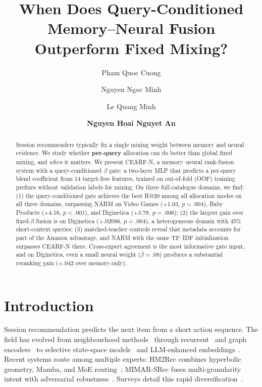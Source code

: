 \documentclass[runningheads]{llncs}
\newcommand{\method}{CEARF-N}
\begin{document}
\title{When Does Query-Conditioned Memory--Neural Fusion Outperform Fixed Mixing?}
\author{Pham Quoc Cuong \and
Nguyen Ngoc Minh \and
Le Quang Minh \and
\textbf{Nguyen Hoai Nguyet An}}
\maketitle

\begin{abstract}
Session recommenders typically fix a single mixing weight between memory and
neural evidence. We study whether \textbf{per-query} allocation can do better
than global fixed mixing, and \emph{when} it matters. We present \method{}, a
memory--neural rank-fusion system with a query-conditioned $\beta$ gate: a
two-layer MLP that predicts a per-query blend coefficient from 14 target-free
features, trained on out-of-fold (OOF) training prefixes without validation
labels for mixing. On three full-catalogue domains, we find: (1) the
query-conditioned gate achieves the best R@20 among all allocation modes on
all three domains, surpassing NARM on Video Games ($+$1.03, $p=.004$), Baby
Products ($+$4.16, $p<.001$), and Diginetica ($+$3.78, $p=.006$); (2) the
largest gain over fixed-$\beta$ fusion is on Diginetica ($+$.02086,
$p=.004$), a heterogeneous domain with 45\% short-context queries; (3)
matched-teacher controls reveal that metadata accounts for part of the Amazon
advantage, and NARM with the same TF--IDF initialization surpasses \method{}
there. Cross-expert agreement is the most informative gate input, and on
Diginetica, even a small neural weight ($\bar\beta = .08$) produces a
substantial reranking gain ($+$.042 over memory-only).
\end{abstract}

\section{Introduction}
Session recommendation predicts the next item from a short action sequence.
The field has evolved from neighbourhood methods~\cite{ludewig2018evaluation,
garg2019stan} through recurrent~\cite{hidasi2016gru4rec,quadrana2018recsys}
and graph encoders~\cite{wu2019srgnn} to selective state-space
models~\cite{sigma2025,gu2024mamba4rec} and LLM-enhanced
embeddings~\cite{llm2rec2025}. Recent systems route among multiple experts:
HM2Rec combines hyperbolic geometry, Mamba, and MoE
routing~\cite{liu2026hm2rec}; MIMAR-SRec fuses multi-granularity intent with
adversarial robustness~\cite{fang2026mimar}. Surveys detail this rapid
diversification~\cite{li2025survey,pan2026survey,lin2025ssmsurvey}.
\end{document}
